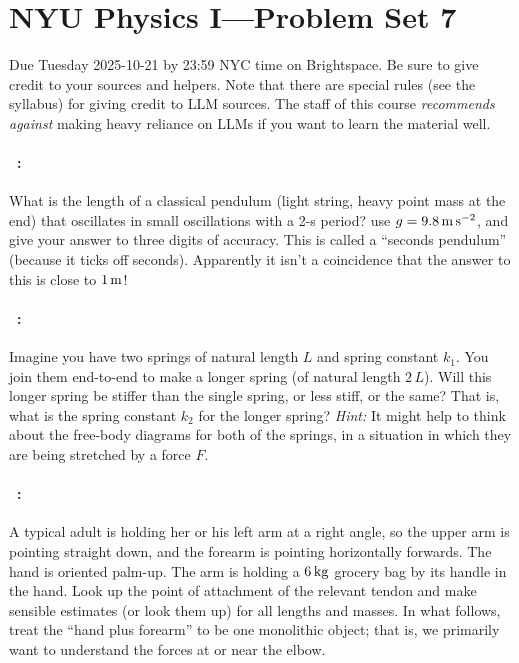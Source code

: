 \documentclass[12pt]{article}
\begin{document}
\section*{NYU Physics I---Problem Set 7}

Due Tuesday 2025-10-21 by 23:59 NYC time on Brightspace.
Be sure to give credit to your sources and helpers.
Note that there are special rules (see the syllabus) for giving credit to LLM sources.
The staff of this course \emph{recommends against} making heavy reliance on LLMs if you want to learn the material well.

\paragraph{\problemname~\theproblem:}%
What is the length of a classical pendulum (light string, heavy point
mass at the end) that oscillates in small oscillations with a
2-s period? use $g=9.8\,\mathrm{m}\,\mathrm{s}^{-2}$, and give your answer to three digits of
accuracy. This is called a ``seconds pendulum'' (because it ticks off
seconds). Apparently it isn't a coincidence that the answer to this is
close to $1\,\mathrm{m}$!

\paragraph{\problemname~\theproblem:}%
Imagine you have two springs of natural length $L$ and spring constant $k_1$.
You join them end-to-end to make a longer spring (of natural length $2\,L$).
Will this longer spring be stiffer than the single spring, or less stiff, or the same?
That is, what is the spring constant $k_2$ for the longer spring?
\textsl{Hint:} It might help to think about the free-body diagrams for both of the springs, in a situation in which they are being stretched by a force $F$.

\paragraph{\problemname~\theproblem:}%
A typical adult is holding her or his left arm at a right angle, so the
upper arm is pointing straight down, and the forearm is pointing
horizontally forwards.  The hand is oriented palm-up.  The arm is holding a
$6\,\mathrm{kg}$ grocery bag by its handle in the hand.  Look up the
point of attachment of the relevant tendon and make sensible estimates
(or look them up) for all lengths and masses.  In what follows, treat
the ``hand plus forearm'' to be one monolithic object; that is, we
primarily want to understand the forces at or near the elbow.
\end{document}
